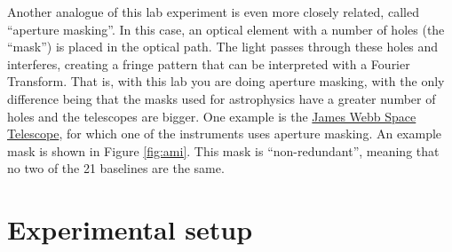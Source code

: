 \documentclass[11pt]{article}
\begin{document}
Another analogue of this lab experiment is even more closely related, called ``aperture masking''. In this case, an optical element with a number of holes (the ``mask'') is placed in the optical path. The light passes through these holes and interferes, creating a fringe pattern that can be interpreted with a Fourier Transform. That is, with this lab you are doing aperture masking, with the only difference being that the masks used for astrophysics have a greater number of holes and the telescopes are bigger. One example is the \href{https://jwst-docs.stsci.edu/jwst-near-infrared-imager-and-slitless-spectrograph/niriss-observing-modes/niriss-aperture-masking-interferometry}{James Webb Space Telescope}, for which one of the instruments uses aperture masking. An example mask is shown in Figure \ref{fig:ami}. This mask is ``non-redundant'', meaning that no two of the 21 baselines are the same.

\clearpage
\section{Experimental setup}\label{sec:exp_setup}
\end{document}
